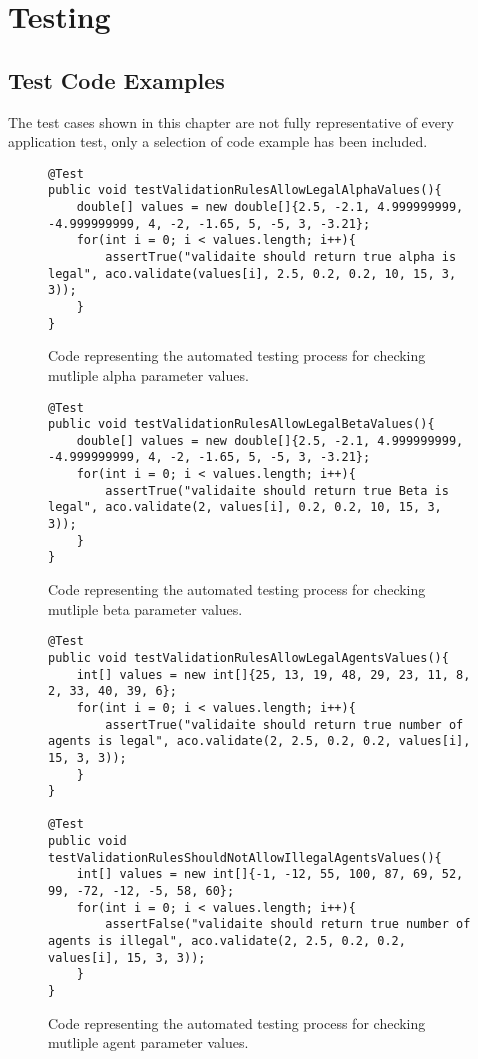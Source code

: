 \chapter{Testing}
\renewcommand{\thechapter}{\Alph{chapter}}

\section{Test Code Examples}

The test cases shown in this chapter are not fully representative of every application test, only a selection of code example has been included.

\begin{figure}[H]
\begin{lstlisting}
@Test
public void testValidationRulesAllowLegalAlphaValues(){
	double[] values = new double[]{2.5, -2.1, 4.999999999, -4.999999999, 4, -2, -1.65, 5, -5, 3, -3.21};
	for(int i = 0; i < values.length; i++){
		assertTrue("validaite should return true alpha is legal", aco.validate(values[i], 2.5, 0.2, 0.2, 10, 15, 3, 3));
	}
}
\end{lstlisting}
\caption[Alpha Parameter Test Code]{Code representing the automated testing process for checking mutliple alpha parameter values.}
\label{testAlpha}
\end{figure}

\begin{figure}[H]
\begin{lstlisting}
@Test
public void testValidationRulesAllowLegalBetaValues(){
	double[] values = new double[]{2.5, -2.1, 4.999999999, -4.999999999, 4, -2, -1.65, 5, -5, 3, -3.21};
	for(int i = 0; i < values.length; i++){
		assertTrue("validaite should return true Beta is legal", aco.validate(2, values[i], 0.2, 0.2, 10, 15, 3, 3));
	}
}
\end{lstlisting}
\caption[Beta Parameter Test Code]{Code representing the automated testing process for checking mutliple beta parameter values.}
\label{testBeta}
\end{figure}

\begin{figure}[H]
\begin{lstlisting}
@Test
public void testValidationRulesAllowLegalAgentsValues(){
	int[] values = new int[]{25, 13, 19, 48, 29, 23, 11, 8, 2, 33, 40, 39, 6};
	for(int i = 0; i < values.length; i++){
		assertTrue("validaite should return true number of agents is legal", aco.validate(2, 2.5, 0.2, 0.2, values[i], 15, 3, 3));
	}
}

@Test
public void testValidationRulesShouldNotAllowIllegalAgentsValues(){
	int[] values = new int[]{-1, -12, 55, 100, 87, 69, 52, 99, -72, -12, -5, 58, 60};
	for(int i = 0; i < values.length; i++){
		assertFalse("validaite should return true number of agents is illegal", aco.validate(2, 2.5, 0.2, 0.2, values[i], 15, 3, 3));
	}
}
\end{lstlisting}
\caption[Agent Parameter Test Code]{Code representing the automated testing process for checking mutliple agent parameter values.}
\label{testAgent}
\end{figure}

